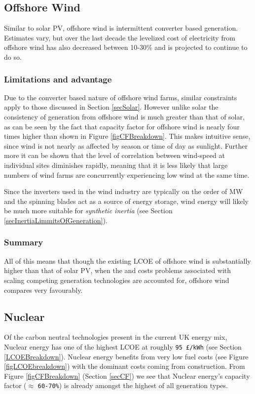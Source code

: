 \documentclass[11pt]{article}
\numberwithin{equation}{section}
\begin{document}
\subsection{Offshore Wind \label{secOffshoreWind}}
\label{sec:org2fa3cd3}
Similar to solar PV, offshore wind is intermittent converter based generation. Estimates vary, but over the last decade the levelized cost of electricity from offshore wind has also decreased between 10-30\% and is projected to continue to do so.

\subsubsection{Limitations and advantage}
\label{sec:orgde896b2}
Due to the converter based nature of offshore wind farms, similar constraints apply to those discussed in Section \ref{secSolar}. However unlike solar the consistency of generation from offshore wind is much greater than that of solar, as can be seen by the fact that capacity factor for offshore wind is nearly four times higher than shown in Figure \ref{figCFBreakdown}. This makes intuitive sense, since wind is not nearly as affected by season or time of day as sunlight. Further more it can be shown that the level of correlation between wind-speed at individual sites diminishes rapidly, meaning that it is less likely that large numbers of wind farms are concurrently experiencing low wind at the same time.

Since the inverters used in the wind industry are typically on the order of MW and the spinning blades act as a source of energy storage, wind energy will likely be much more suitable for \emph{synthetic inertia} (see Section \ref{secInertiaLimmitsOfGeneration}).

\subsubsection{Summary}
\label{sec:org35dc868}
All of this means that though the existing LCOE of offshore wind is substantially higher than that of solar PV, when the and costs problems associated with scaling competing generation technologies are accounted for, offshore wind compares very favourably.

\subsection{Nuclear}
\label{sec:org0d3758d}
Of the carbon neutral technologies present in the current UK energy mix, Nuclear energy has one of the highest LCOE at roughly \texttt{95 £/kWh} (see Section \ref{LCOEBreakdown}). Nuclear energy benefits from very low fuel costs (see Figure \ref{figLCOEbreakdown}) with the dominant costs coming from construction. From Figure \ref{figCFBreakdown} (Section \ref{secCF}) we see that Nuclear energy's capacity factor (\(\approx\) \texttt{60-70\%}) is already amongst the highest of all generation types.
\end{document}
